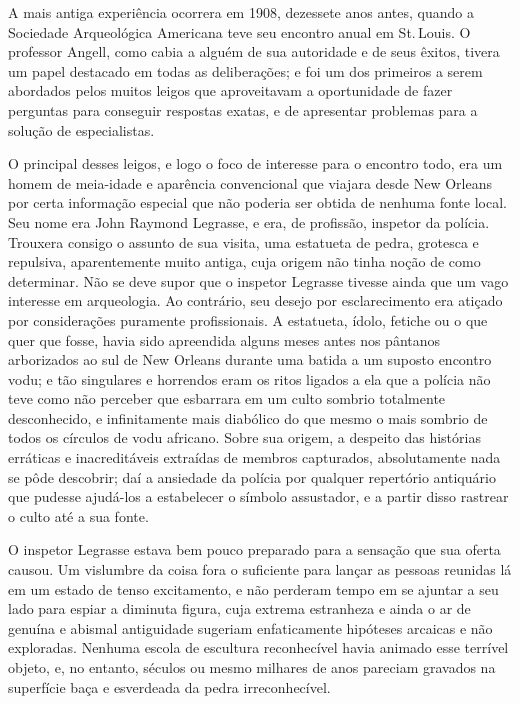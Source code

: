 A mais antiga experiência ocorrera em 1908, dezessete anos antes, quando
a Sociedade Arqueológica Americana teve seu encontro anual em St.\,Louis.
O professor Angell, como cabia a alguém de sua autoridade e de seus
êxitos, tivera um papel destacado em todas as deliberações; e foi um dos
primeiros a serem abordados pelos muitos leigos que aproveitavam a
oportunidade de fazer perguntas para conseguir respostas exatas, e de
apresentar problemas para a solução de especialistas.

O principal desses leigos, e logo o foco de interesse para o encontro
todo, era um homem de meia-idade e aparência convencional que viajara
desde New Orleans por certa informação especial que não poderia ser
obtida de nenhuma fonte local. Seu nome era John Raymond Legrasse, e
era, de profissão, inspetor da polícia. Trouxera consigo o assunto de
sua visita, uma estatueta de pedra, grotesca e repulsiva, aparentemente
muito antiga, cuja origem não tinha noção de como determinar. Não se
deve supor que o inspetor Legrasse tivesse ainda que um vago interesse
em arqueologia. Ao contrário, seu desejo por esclarecimento era atiçado
por considerações puramente profissionais. A estatueta, ídolo, fetiche
ou o que quer que fosse, havia sido apreendida alguns meses antes nos
pântanos arborizados ao sul de New Orleans durante uma batida a um
suposto encontro vodu; e tão singulares e horrendos eram os ritos
ligados a ela que a polícia não teve como não perceber que esbarrara em
um culto sombrio totalmente desconhecido, e infinitamente mais diabólico
do que mesmo o mais sombrio de todos os círculos de vodu africano. Sobre
sua origem, a despeito das histórias erráticas e inacreditáveis
extraídas de membros capturados, absolutamente nada se pôde descobrir;
daí a ansiedade da polícia por qualquer repertório antiquário que
pudesse ajudá-los a estabelecer o símbolo assustador, e a partir disso
rastrear o culto até a sua fonte.

O inspetor Legrasse estava bem pouco preparado para a sensação que sua
oferta causou. Um vislumbre da coisa fora o suficiente para lançar as
pessoas reunidas lá em um estado de tenso excitamento, e não perderam
tempo em se ajuntar a seu lado para espiar a diminuta figura, cuja
extrema estranheza e ainda o ar de genuína e abismal antiguidade
sugeriam enfaticamente hipóteses arcaicas e não exploradas. Nenhuma
escola de escultura reconhecível havia animado esse terrível objeto, e,
no entanto, séculos ou mesmo milhares de anos pareciam gravados na
superfície baça e esverdeada da pedra irreconhecível.

